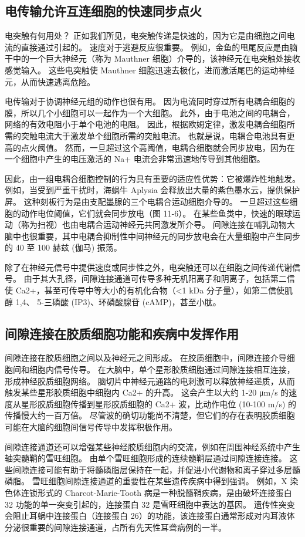 \subsection{电传输允许互连细胞的快速同步点火}
电突触有何用处？ 正如我们所见，电突触传递是快速的，因为它是由细胞之间电流的直接通过引起的。 速度对于逃避反应很重要。 例如，金鱼的甩尾反应是由脑干中的一个巨大神经元（称为 Mauthner 细胞）介导的，该神经元在电突触处接收感觉输入。 这些电突触使 Mauthner 细胞迅速去极化，进而激活尾巴的运动神经元，从而快速逃离危险。

电传输对于协调神经元组的动作也很有用。 因为电流同时穿过所有电耦合细胞的膜，所以几个小细胞可以一起作为一个大细胞。 此外，由于电池之间的电耦合，网络的有效电阻小于单个电池的电阻。 因此，根据欧姆定律，激发电耦合细胞所需的突触电流大于激发单个细胞所需的突触电流。 也就是说，电耦合电池具有更高的点火阈值。 然而，一旦超过这个高阈值，电耦合细胞就会同步放电，因为在一个细胞中产生的电压激活的 Na+ 电流会非常迅速地传导到其他细胞。

因此，由一组电耦合细胞控制的行为具有重要的适应性优势：它被爆炸性地触发。 例如，当受到严重干扰时，海蜗牛 Aplysia 会释放出大量的紫色墨水云，提供保护屏。 这种刻板行为是由支配墨腺的三个电耦合运动细胞介导的。 一旦超过这些细胞的动作电位阈值，它们就会同步放电（图 11-6）。 在某些鱼类中，快速的眼球运动（称为扫视）也由电耦合运动神经元共同激发所介导。 间隙连接在哺乳动物大脑中也很重要，其中电耦合抑制性中间神经元的同步放电会在大量细胞中产生同步的 40 至 100 赫兹 (伽马) 振荡。

除了在神经元信号中提供速度或同步性之外，电突触还可以在细胞之间传递代谢信号。 由于其大孔径，间隙连接通道可传导多种无机阳离子和阴离子，包括第二信使 Ca2+，甚至可传导中等大小的有机化合物（<1 kDa 分子量），如第二信使肌醇 1,4、 5-三磷酸 (IP3)、环磷酸腺苷 (cAMP)，甚至小肽。

\subsection{间隙连接在胶质细胞功能和疾病中发挥作用}
间隙连接在胶质细胞之间以及神经元之间形成。 在胶质细胞中，间隙连接介导细胞间和细胞内信号传导。 在大脑中，单个星形胶质细胞通过间隙连接相互连接，形成神经胶质细胞网络。 脑切片中神经元通路的电刺激可以释放神经递质，从而触发某些星形胶质细胞中细胞内 Ca2+ 的升高。 这会产生以大约 1-20 μm/s 的速度从星形胶质细胞传播到星形胶质细胞的 Ca2+ 波，比动作电位 (10-100 m/s) 的传播慢大约一百万倍。 尽管波的确切功能尚不清楚，但它们的存在表明胶质细胞可能在大脑的细胞间信号传导中发挥积极作用。

间隙连接通道还可以增强某些神经胶质细胞内的交流，例如在周围神经系统中产生轴突髓鞘的雪旺细胞。 由单个雪旺细胞形成的连续髓鞘层通过间隙连接连接。 这些间隙连接可能有助于将髓磷脂层保持在一起，并促进小代谢物和离子穿过多层髓磷脂。 雪旺细胞间隙连接通道的重要性在某些遗传疾病中得到强调。 例如，X 染色体连锁形式的 Charcot-Marie-Tooth 病是一种脱髓鞘疾病，是由破坏连接蛋白 32 功能的单一突变引起的，连接蛋白 32 是雪旺细胞中表达的基因。 遗传性突变会阻止耳蜗中连接蛋白（连接蛋白 26）的功能，该连接蛋白通常形成对内耳液体分泌很重要的间隙连接通道，占所有先天性耳聋病例的一半。


